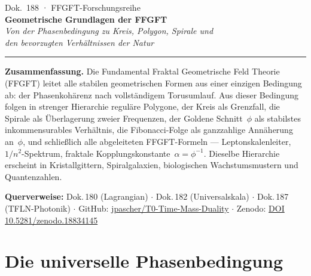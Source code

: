 
\thispagestyle{firstpage}
\begin{center}
  {\small\color{T0gray} Dok.~188 · FFGFT-Forschungsreihe}\\[6pt]
  {\LARGE\bfseries\color{T0blue}
    Geometrische Grundlagen der FFGFT}\\[6pt]
  {\large\itshape\color{T0gray}
    Von der Phasenbedingung zu Kreis, Polygon, Spirale und\\
    den bevorzugten Verhältnissen der Natur}\\[8pt]
  {\color{T0red}\rule{0.65\linewidth}{1.5pt}}
\end{center}
\vspace{4pt}

\begin{infobox}
\textbf{Zusammenfassung.}
Die Fundamental Fraktal Geometrische Feld Theorie (FFGFT) leitet alle
stabilen geometrischen Formen aus einer einzigen Bedingung ab: der
Phasenkohärenz nach vollständigem Torusumlauf. Aus dieser Bedingung
folgen in strenger Hierarchie reguläre Polygone, der Kreis als Grenzfall,
die Spirale als Überlagerung zweier Frequenzen, der Goldene Schnitt~$\phi$
als stabilstes inkommensurables Verhältnis, die Fibonacci-Folge als
ganzzahlige Annäherung an~$\phi$, und schließlich alle abgeleiteten
FFGFT-Formeln — Leptonskalenleiter, $1/n^2$-Spektrum, fraktale
Kopplungskonstante~$\alpha = \phi^{-1}$. Dieselbe Hierarchie erscheint
in Kristallgittern, Spiralgalaxien, biologischen Wachstumsmustern und
Quantenzahlen.

\smallskip\noindent\textbf{Querverweise:}
Dok.\,180 (Lagrangian) $\cdot$
Dok.\,182 (Universalskala) $\cdot$
Dok.\,187 (TFLN-Photonik) $\cdot$
GitHub: \href{https://github.com/jpascher/T0-Time-Mass-Duality}{jpascher/T0-Time-Mass-Duality} $\cdot$
Zenodo: \href{https://zenodo.org/records/18834145}{DOI 10.5281/zenodo.18834145}
\end{infobox}

\tableofcontents
\bigskip

\section{Die universelle Phasenbedingung}

